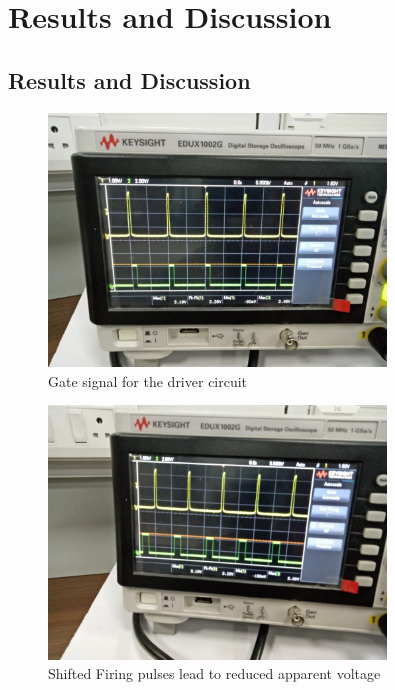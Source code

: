  \chapter{Results and Discussion}
        \section{Results and Discussion}
        
        \begin{figure}[h!]
        	\centering
        	\includegraphics[width=0.8\textwidth]{photos/results/InterruptTriggerofmicrocontroller.jpg}
        	\caption{Gate signal for the driver circuit}
        \end{figure}
	    \begin{figure}[H]
	    	\centering
	    	\includegraphics[width=0.8\textwidth]{photos/results/ZeroCrossingCircuitWaveform.jpg}
	    	\caption{Shifted Firing pulses lead to reduced apparent voltage}
	    \end{figure}
